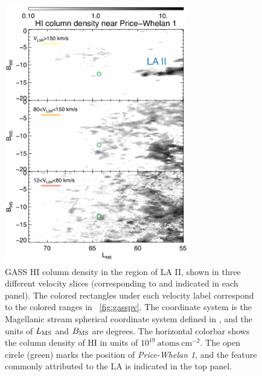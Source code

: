 \documentclass[twocolumn]{aastex62}
\newcommand{\hi}{H{\footnotesize I} }
\newcommand{\clustername}{\textsl{Price-Whelan 1}}
\begin{document}
\begin{figure}[t]
\centering
\includegraphics[width=8cm]{figures/gass_maps_v3.pdf}
\caption{GASS \hi column density in the region of LA II, shown in three different velocity slices (corresponding to and indicated in each panel).
The colored rectangles under each velocity label correspond to the colored ranges in \figurename~\ref{fig:gasspv}.
The coordinate system is the Magellanic stream spherical coordinate system defined in \cite{Nidever:2008}, and the units of $L_{\rm MS}$ and $B_{\rm MS}$ are degrees.
The horizontal colorbar shows the column density of \hi in units of $10^{19}~\textrm{atoms}~\textrm{cm}^{-2}$.
The open circle (green) marks the position of \clustername, and the feature commonly attributed to the LA is indicated in the top panel.}
\label{fig:gass_maps}
\end{figure}
\end{document}
